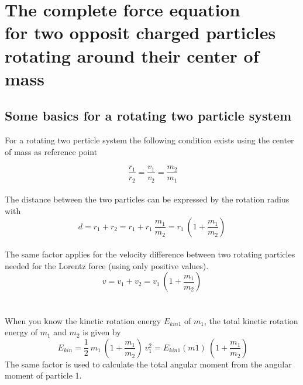 \documentclass[10pt,titlepage]{article}
\begin{document}

\section{The complete force equation \\ for two opposit charged particles \\rotating around their center of mass}

\subsection{Some basics for a rotating two particle system}
For a rotating two perticle system the following condition exists using the center of mass as reference point

\begin{equation}
\ \frac{r_1}{r_2}=\frac{v_1}{v_2}=\frac{m_2}{m_1}
\end{equation}
\\
The distance between the two particles can be expressed by the rotation radius with
\begin{equation}
d=r_1+r_2=r_1+r_1 \ \frac{m_1}{m_2}=r_1 \ (1+\frac{m_1}{m_2})
\end{equation}
\\
The same factor applies for the velocity difference between two rotating particles needed for the Lorentz force
(using only positive values). 
\begin{equation}
v=v_1+v_2=v_1 \ (1+\frac{m_1}{m_2})
\end{equation}
\\\\
When you know the kinetic rotation energy $E_{kin1}$ of $m_1$, the total kinetic rotation energy of $m_1$ and $m_2$ is given by
\begin{equation}
\ E_{kin}=\frac{1}{2} \ m_1 \ (1+\frac{m_1}{m_2}) \ v_1^2=E_{kin1}(m1) \ (1+\frac{m_1}{m_2})
\end{equation}
The same factor is used to calculate the total angular moment from the angular moment of particle 1.
\\\\

\end{document}
